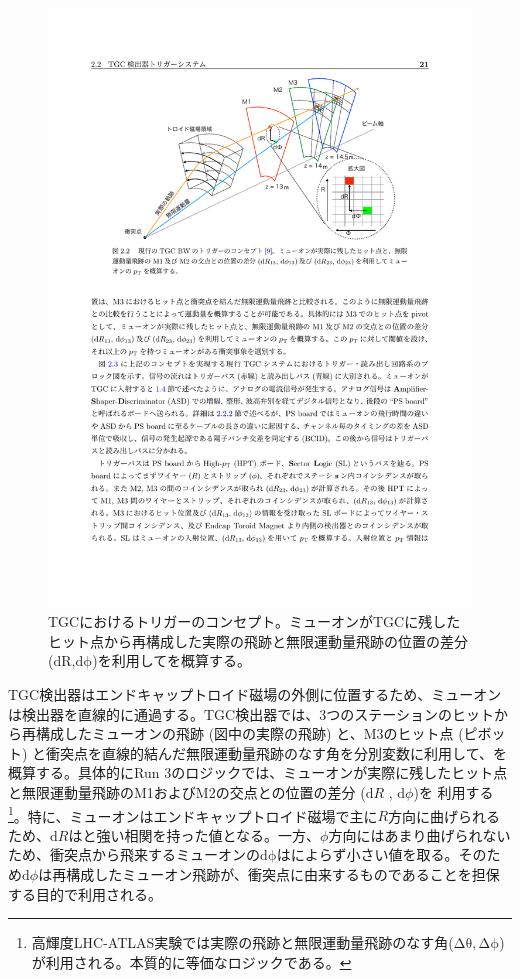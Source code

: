 \begin{figure} 
\centering
\includegraphics[width=16cm]{fig/Intro/TGC_triggerconcept.pdf}
\caption[TGCにおけるトリガーのコンセプト]{TGCにおけるトリガーのコンセプト\cite{mt_akatsuka}。ミューオンがTGCに残したヒット点から再構成した実際の飛跡と無限運動量飛跡の位置の差分 ($\mathrm{dR}$,$\mathrm{d\phi}$)を利用して\pt を概算する。}
\label{TGC_triggerconcept}
\end{figure}

TGC検出器はエンドキャップトロイド磁場の外側に位置するため、ミューオンは検出器を直線的に通過する。TGC検出器では、3つのステーションのヒットから再構成したミューオンの飛跡 (図中の実際の飛跡) と、M3のヒット点 (ピボット) と衝突点を直線的結んだ無限運動量飛跡のなす角を分別変数に利用して、\pt を概算する。具体的にRun 3のロジックでは、ミューオンが実際に残したヒット点と無限運動量飛跡のM1およびM2の交点との位置の差分  ($\mathrm{d}R$ , $\mathrm{d}\phi$)を 利用する\footnote{高輝度LHC-ATLAS実験では実際の飛跡と無限運動量飛跡のなす角($\mathrm{\Delta\theta, \Delta\phi}$)が利用される。本質的に等価なロジックである。}。特に、ミューオンはエンドキャップトロイド磁場で主に$R$方向に曲げられるため、$\mathrm{d}R$は\pt と強い相関を持った値となる。一方、$\phi$方向にはあまり曲げられないため、衝突点から飛来するミューオンの$\mathrm{d\phi}$は\pt によらず小さい値を取る。そのため$\mathrm{d}\phi$は再構成したミューオン飛跡が、衝突点に由来するものであることを担保する目的で利用される。

